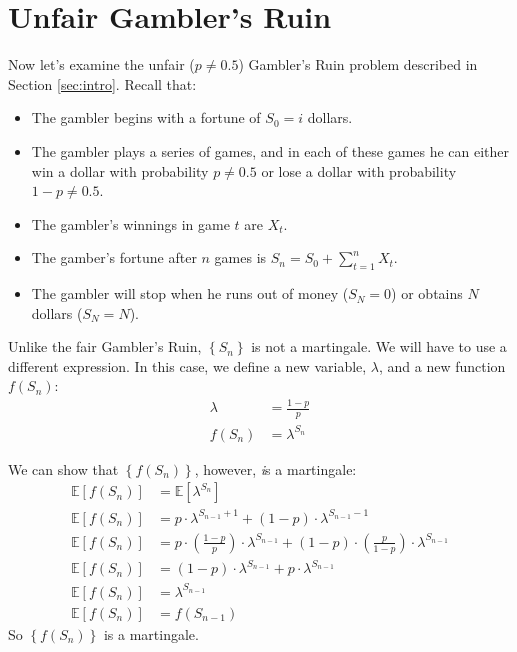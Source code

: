 \section{Unfair Gambler's Ruin}
\label{sec:unfair}

Now let's examine the unfair ($p \neq 0.5$) Gambler's Ruin
problem described in Section \ref{sec:intro}.
Recall that:
\begin{itemize}
  \item The gambler begins with a fortune of $S_0 = i$ dollars.
  \item The gambler plays a series of games, and in each of these games he can either win a dollar with probability $p \neq 0.5$ or lose a dollar with probability $1-p \neq 0.5$.  
  \item The gambler's winnings in game $t$ are $X_t$.
  \item The gamber's fortune after $n$ games is $S_n = S_0 + \sum\limits_{t = 1}^{n}X_{t}$.
  \item The gambler will stop when he runs out of money ($S_N = 0$) or obtains $N$ dollars ($S_N = N$).
\end{itemize}

Unlike the fair Gambler's Ruin, $\left\{S_n\right\}$ is not a martingale.
We will have to use a different expression.
In this case, we define a new variable, $\lambda$, and a new function $f\left(S_n\right)$:
\begin{align}
  \lambda &= \frac{1-p}{p} \\
  f(S_n) &= \lambda^{S_n}
\end{align}

We can show that $\left\{f\left(S_n\right)\right\}$, however, {\textit is} a martingale:
\begin{align}
  \mathbb{E}[f(S_n)] &= \mathbb{E}[\lambda^{S_n}] \\ 
  \mathbb{E}[f(S_n)] &= p \cdot \lambda^{S_{n-1}+1} + (1-p) \cdot \lambda^{S_{n-1}-1} \\ 
  \mathbb{E}[f(S_n)] &= p \cdot \left(\frac{1-p}{p}\right)\cdot\lambda^{S_{n-1}} + (1-p) \cdot \left(\frac{p}{1-p}\right)\cdot \lambda^{S_{n-1}}  \\
  \mathbb{E}[f(S_n)] &= (1-p) \cdot\lambda^{S_{n-1}} + p \cdot \lambda^{S_{n-1}}  \\
  \mathbb{E}[f(S_n)] &= \lambda^{S_{n-1}} \\ 
  \mathbb{E}[f(S_n)] &= f(S_{n-1}) 
\end{align}
So $\left\{f\left(S_n\right)\right\}$ is a martingale.

